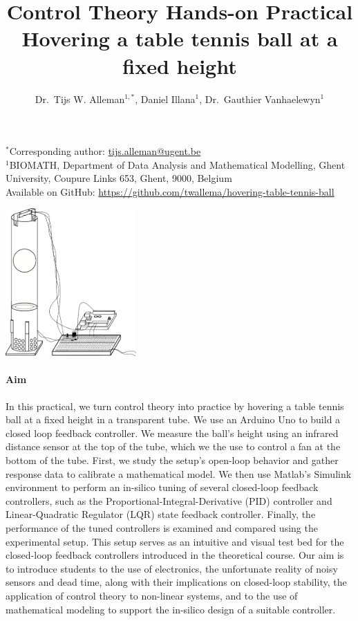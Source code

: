 \documentclass[10pt,twoside,openright]{article}
\begin{document}
\title{%
  Control Theory Hands-on Practical \\
  \Large Hovering a table tennis ball at a fixed height}
  
\author{Dr.~Tijs W. Alleman$^{1,*}$, Daniel Illana$^{1}$, Dr.~Gauthier Vanhaelewyn$^{1}$}
\maketitle

$^*$Corresponding author: \url{tijs.alleman@ugent.be} \\
$^1$BIOMATH, Department of Data Analysis and Mathematical Modelling, Ghent University, Coupure Links 653, Ghent, 9000, Belgium\\
Available on GitHub: \url{https://github.com/twallema/hovering-table-tennis-ball}\\

\begin{center}
\includegraphics[width=5cm]{setup.pdf}
\end{center}

\paragraph{Aim} In this practical, we turn control theory into practice by hovering a table tennis ball at a fixed height in a transparent tube. We use an Arduino Uno to build a closed loop feedback controller. We measure the ball's height using an infrared distance sensor at the top of the tube, which we the use to control a fan at the bottom of the tube. First, we study the setup's open-loop behavior and gather response data to calibrate a mathematical model. We then use Matlab's Simulink environment to perform an in-silico tuning of several closed-loop feedback controllers, such as the Proportional-Integral-Derivative (PID) controller and Linear-Quadratic Regulator (LQR) state feedback controller. Finally, the performance of the tuned controllers is examined and compared using the experimental setup. This setup serves as an intuitive and visual test bed for the closed-loop feedback controllers introduced in the theoretical course. Our aim is to introduce students to the use of electronics, the unfortunate reality of noisy sensors and dead time, along with their implications on closed-loop stability, the application of control theory to non-linear systems, and to the use of mathematical modeling to support the in-silico design of a suitable controller.
\end{document}
